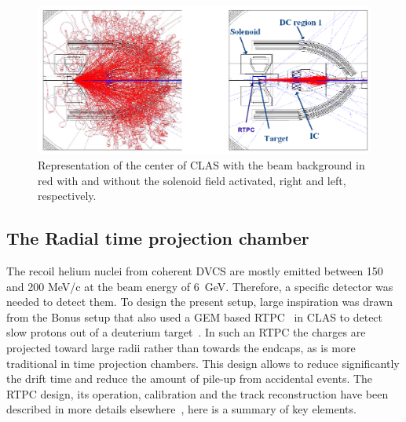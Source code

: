 \documentclass{article}
\begin{document}
\begin{figure}[tbp!]
\center
\includegraphics[width=14cm]{fig3/solenoid.png}
\caption{Representation of the center of CLAS with the beam background in red with and without
	the solenoid field activated, right and left, respectively.}
\label{fig:Solenoid}
\end{figure}


\subsection{The Radial time projection chamber}

The recoil helium nuclei from coherent DVCS are mostly emitted between 150 
and 200 MeV/c at the beam energy of 6~GeV. Therefore, a specific detector was 
needed to detect them. To design the present setup, large inspiration was drawn from the 
Bonus setup that also used a GEM based RTPC~\cite{Fenker:2008zz} in CLAS to 
detect slow protons out of a deuterium target~\cite{Baillie:2011za}. In such an RTPC the 
charges are projected toward large radii 
rather than towards the endcaps, as is more traditional in time 
projection chambers. This design allows to reduce significantly the drift time and reduce the 
amount of pile-up from accidental events. The RTPC design, its operation, calibration and 
the track reconstruction have been described in more 
details elsewhere~\cite{Dupre:2017upj}, here is a summary of key elements.
\end{document}
